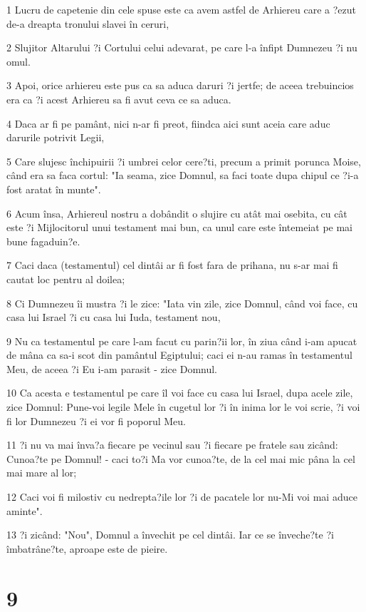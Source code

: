 \par 1 Lucru de capetenie din cele spuse este ca avem astfel de Arhiereu care a ?ezut de-a dreapta tronului slavei în ceruri,
\par 2 Slujitor Altarului ?i Cortului celui adevarat, pe care l-a înfipt Dumnezeu ?i nu omul.
\par 3 Apoi, orice arhiereu este pus ca sa aduca daruri ?i jertfe; de aceea trebuincios era ca ?i acest Arhiereu sa fi avut ceva ce sa aduca.
\par 4 Daca ar fi pe pamânt, nici n-ar fi preot, fiindca aici sunt aceia care aduc darurile potrivit Legii,
\par 5 Care slujesc închipuirii ?i umbrei celor cere?ti, precum a primit porunca Moise, când era sa faca cortul: "Ia seama, zice Domnul, sa faci toate dupa chipul ce ?i-a fost aratat în munte".
\par 6 Acum însa, Arhiereul nostru a dobândit o slujire cu atât mai osebita, cu cât este ?i Mijlocitorul unui testament mai bun, ca unul care este întemeiat pe mai bune fagaduin?e.
\par 7 Caci daca (testamentul) cel dintâi ar fi fost fara de prihana, nu s-ar mai fi cautat loc pentru al doilea;
\par 8 Ci Dumnezeu îi mustra ?i le zice: "Iata vin zile, zice Domnul, când voi face, cu casa lui Israel ?i cu casa lui Iuda, testament nou,
\par 9 Nu ca testamentul pe care l-am facut cu parin?ii lor, în ziua când i-am apucat de mâna ca sa-i scot din pamântul Egiptului; caci ei n-au ramas în testamentul Meu, de aceea ?i Eu i-am parasit - zice Domnul.
\par 10 Ca acesta e testamentul pe care îl voi face cu casa lui Israel, dupa acele zile, zice Domnul: Pune-voi legile Mele în cugetul lor ?i în inima lor le voi scrie, ?i voi fi lor Dumnezeu ?i ei vor fi poporul Meu.
\par 11 ?i nu va mai înva?a fiecare pe vecinul sau ?i fiecare pe fratele sau zicând: Cunoa?te pe Domnul! - caci to?i Ma vor cunoa?te, de la cel mai mic pâna la cel mai mare al lor;
\par 12 Caci voi fi milostiv cu nedrepta?ile lor ?i de pacatele lor nu-Mi voi mai aduce aminte".
\par 13 ?i zicând: "Nou", Domnul a învechit pe cel dintâi. Iar ce se înveche?te ?i îmbatrâne?te, aproape este de pieire.

\chapter{9}

